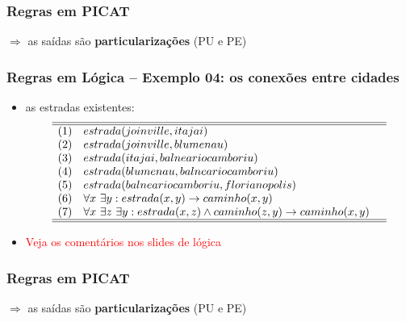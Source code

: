 \documentclass[10pt]{beamer}
\begin{document}
\begin{frame}[allowframebreaks=0.9]
 \frametitle{Regras em PICAT}


  $\Rightarrow $ as saídas são \textbf{particularizações} (PU e PE)
 
\end{frame}

\begin{frame}
    \frametitle{Regras  em Lógica -- Exemplo 04: os conexões entre cidades}
   
   \begin{itemize}
    \item as estradas existentes:
  $$\begin{array}{lll} \hline\hline
	(1) & estrada(joinville, itajai) & \\
	(2) & estrada(joinville, blumenau) & \\
	(3) & estrada(itajai, balneariocamboriu) & \\
	(4) & estrada(blumenau, balneariocamboriu) & \\
	(5) & estrada(balneariocamboriu, florianopolis) & \\
	(6) & \forall x ~\exists y: estrada(x, y) \rightarrow caminho(x, y) & \\
	(7) & \forall x ~\exists z ~\exists y: estrada(x, z) \wedge caminho(z, y) \rightarrow caminho  (x,y) &\\
	\hline\hline
	\end{array}$$	

    \item \textcolor{red}{Veja os comentários nos slides de lógica}
    \end{itemize}
\end{frame}

\begin{frame}[allowframebreaks=0.9]
 \frametitle{Regras em PICAT}


  $\Rightarrow $ as saídas são \textbf{particularizações} (PU e PE)
 
\end{frame}

\end{document}
